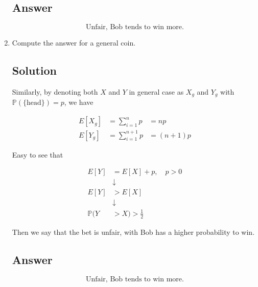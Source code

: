 \documentclass[12pt]{article}
\newcommand{\bP}{\mathbb{P}}
\begin{document}
\begin{enumerate}[start=1,label={\bfseries Part \arabic*:},leftmargin=0in]
		\subsection*{Answer}
		
			\[\boxed{\text{Unfair, Bob tends to win more.}}\]
		
		\bigskip\item Compute the answer for a general coin.
		
		\subsection*{Solution}
		
			Similarly, by denoting both $X$ and $Y$ in general case as $X_g$ and $Y_g$ with $\bP(\{\text{head}\}) = p$, we have
			
			\[
			\begin{aligned}
				E[X_g] &= \sum_{i=1}^np &= np\\
				E[Y_g] &= \sum_{i=1}^{n+1}p &= (n+1)p
			\end{aligned}
			\]
			
			Easy to see that
			
			\[
			\begin{aligned}
				E[Y] &= E[X] + p,\quad p > 0\\
				&\downarrow\\
				E[Y] &> E[X]\\
				&\downarrow\\
				\bP(Y&>X) > \frac{1}{2}
			\end{aligned}
			\]
			
			Then we say that the bet is unfair, with Bob has a higher probability to win.
		
		\subsection*{Answer}
		
			\[\boxed{\text{Unfair, Bob tends to win more.}}\]
	\end{enumerate}
	
\end{document}
